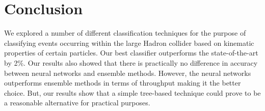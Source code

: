 \section{Conclusion}
\label{sec:conclusion}

We explored a number of different classification techniques for the purpose of classifying events occurring within the large Hadron collider based on kinematic properties of certain particles. Our best classifier outperforms the state-of-the-art by 2\%. Our results also showed that there is practically no difference in accuracy between neural networks and ensemble methods. However, the neural networks outperforms ensemble methods in terms of throughput making it the better choice. But, our results show that a simple tree-based technique could prove to be a reasonable alternative for practical purposes.
